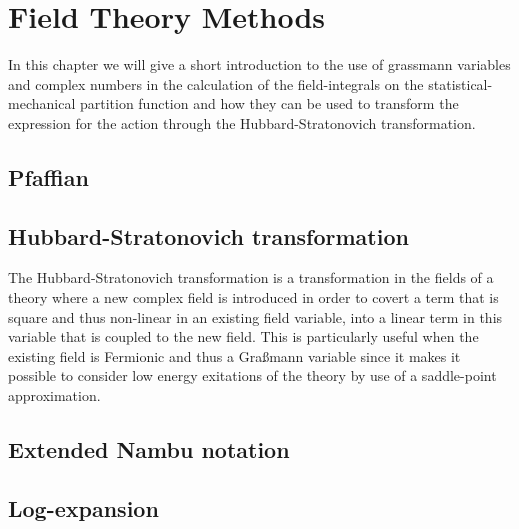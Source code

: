 \chapter{Field Theory Methods}

In this chapter we will give a short introduction to the use of grassmann variables
and complex numbers in the calculation of the field-integrals on the
statistical-mechanical partition function and how they can be used to transform the
expression for the action through the Hubbard-Stratonovich transformation.

\section{Pfaffian}

\section{Hubbard-Stratonovich transformation}

The Hubbard-Stratonovich transformation is a transformation in the fields of a theory where a new complex field is introduced
in order to covert a term that is square and thus non-linear in an existing field variable, into a linear term in this
variable that is coupled to the new field. This is particularly useful when the existing field is Fermionic and thus
a Gra\ss mann variable since it makes it possible to consider low energy exitations of the theory by use of a saddle-point
approximation.

\section{Extended Nambu notation}

\section{Log-expansion}
